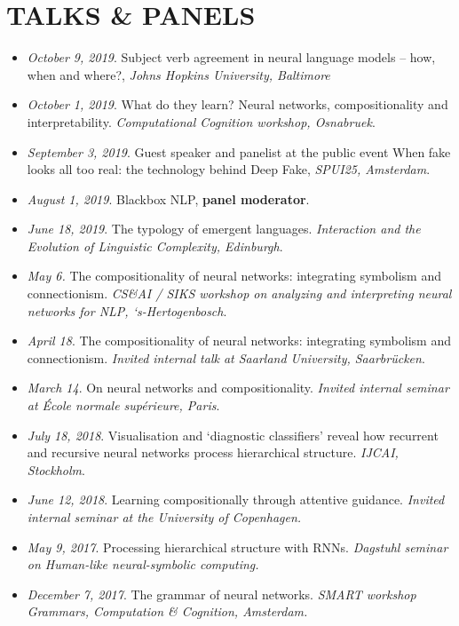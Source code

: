 \section{TALKS \& PANELS}

\begin{itemize}
\setlength\itemsep{5pt}
\item \textit{October 9, 2019}. Subject verb agreement in neural language models -- how, when and where?, \textit{Johns Hopkins University, Baltimore}
    \item \textit{October 1, 2019}. What do they learn? Neural networks, compositionality and interpretability. \textit{Computational Cognition workshop, Osnabruek}.
    \item \textit{September 3, 2019}. Guest speaker and panelist at the public event When fake looks all too real: the technology behind Deep Fake, \textit{SPUI25, Amsterdam}.
    \item \textit{August 1, 2019}. Blackbox NLP, \textbf{panel moderator}.
    \item \textit{June 18, 2019}. The typology of emergent languages. \textit{Interaction and the Evolution of Linguistic Complexity, Edinburgh}.
    \item \textit{May 6.} The compositionality of neural networks: integrating symbolism and connectionism. \textit{CS\&AI / SIKS workshop on analyzing and interpreting neural networks for NLP, ‘s-Hertogenbosch}.
    \item \textit{April 18}. The compositionality of neural networks: integrating symbolism and connectionism. \textit{Invited internal talk at Saarland University, Saarbrücken}.
    \item \textit{March 14}. On neural networks and compositionality. \textit{Invited internal seminar at École normale supérieure, Paris}.
    \item \textit{July 18, 2018}. Visualisation and ‘diagnostic classifiers’ reveal how recurrent and recursive neural networks process hierarchical structure. \textit{IJCAI, Stockholm}.
    \item \textit{June 12, 2018}. Learning compositionally through attentive guidance. \textit{Invited internal seminar at the University of Copenhagen.}
    \item \textit{May 9, 2017}. Processing hierarchical structure with RNNs.\textit{ Dagstuhl seminar on Human-like neural-symbolic computing.}
    \item \textit{December 7, 2017}. The grammar of neural networks. \textit{SMART workshop Grammars, Computation \& Cognition, Amsterdam.}

\end{itemize}
